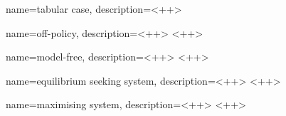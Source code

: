 {
    name={tabular case},
    description={}<++>
}

{
    name=off-policy,
    description={}<++>
}<++>

{
    name=model-free,
    description={}<++>
}<++>

{
    name={equilibrium seeking system},
    description={}<++>
}<++>

{
    name={maximising system},
    description={}<++>
}<++>

